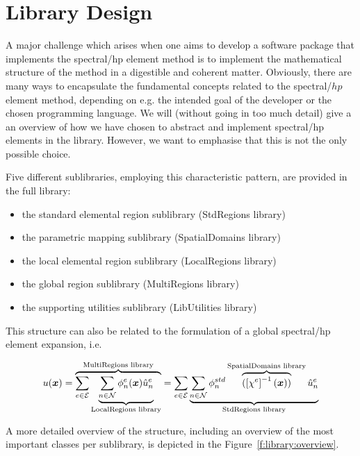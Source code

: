 \chapter{Library Design}

A major challenge which arises when one aims to develop a software package that
implements the spectral/hp element method is to implement the mathematical
structure of the method in a digestible and coherent matter. Obviously, there
are many ways to encapsulate the fundamental concepts related to the
spectral/$hp$ element method, depending on e.g. the intended goal of the
developer or the chosen programming language. We will (without going in too much
detail) give a an overview of how we have chosen to abstract and implement
spectral/hp elements in the \nekpp library. However, we want to emphasise that
this is not the only possible choice.

Five different sublibraries, employing this characteristic pattern, are provided
in the full \nekpp library:

\begin{itemize}
\item the standard elemental region sublibrary (StdRegions library)
\item the parametric mapping sublibrary (SpatialDomains library)
\item the local elemental region sublibrary (LocalRegions library)
\item the global region sublibrary (MultiRegions library)
\item the supporting utilities sublibrary (LibUtilities library)
\end{itemize}

This structure can also be related to the formulation of a global spectral/hp
element expansion, i.e.

\begin{align*}
  u(\boldsymbol{x})=\overbrace{\sum_{e\in\mathcal{E}}\underbrace{\sum_{n\in\mathcal{N}}\phi^e_n(\boldsymbol{x})\hat{u}^e_n}_{\mbox{\scriptsize{LocalRegions
  library}}}}^{\mbox{\scriptsize{MultiRegions
  library}}}=\sum_{e\in\mathcal{E}}\underbrace{\sum_{n\in\mathcal{N}}\phi^{std}_n\overbrace{(\left[\chi^e\right]^{-1}(\boldsymbol{x}))}^{\mbox{\scriptsize{SpatialDomains
  library}}}\hat{u}^e_n}_{\mbox{\scriptsize{StdRegions library}}}
\end{align*}

A more detailed overview of the \nekpp structure, including an overview of
the most important classes per sublibrary, is depicted in the
Figure~\ref{f:library:overview}.

